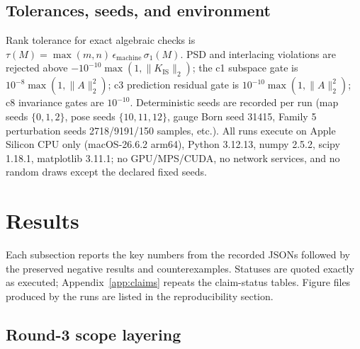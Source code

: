 \documentclass[12pt]{article}
\begin{document}
\subsection{Tolerances, seeds, and environment}

Rank tolerance for exact algebraic checks is
$\tau(M)=\max(m,n)\,\epsilon_{\mathrm{machine}}\,\sigma_1(M)$. PSD and
interlacing violations are rejected above
$-10^{-10}\max(1,\|K_{\mathrm{IS}}\|_2)$; the c1 subspace gate is
$10^{-8}\max(1,\|A\|_2^2)$; c3 prediction residual gate is
$10^{-10}\max(1,\|A\|_2^2)$; c8 invariance gates are $10^{-10}$. Deterministic
seeds are recorded per run (map seeds $\{0,1,2\}$, pose seeds
$\{10,11,12\}$, gauge Born seed 31415, Family 5 perturbation seeds
2718/9191/150 samples, etc.). All runs execute on Apple Silicon CPU only
(macOS-26.6.2 arm64), Python 3.12.13, numpy 2.5.2, scipy 1.18.1, matplotlib
3.11.1; no GPU/MPS/CUDA, no network services, and no random draws except the
declared fixed seeds.

\section{Results}\label{sec:results}

Each subsection reports the key numbers from the recorded JSONs followed by
the preserved negative results and counterexamples. Statuses are quoted
exactly as executed; Appendix~\ref{app:claims} repeats the claim-status
tables. Figure files produced by the runs are listed in the reproducibility
section.

\subsection{Round-3 scope layering}\label{sec:scope-layering}
\end{document}
